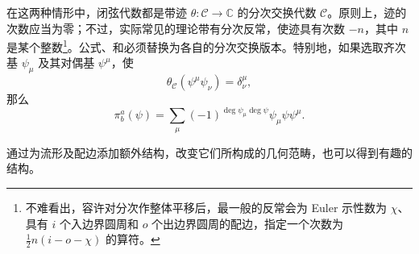 在这两种情形中，闭弦代数都是带迹 $\theta\colon\mathcal{C}\to\mathbb{C}$ 的分次交换代数 $\mathcal{C}$。原则上，迹的次数应当为零；不过，实际常见的理论带有分次反常，使迹具有次数 $-n$，其中 $n$ 是某个整数\footnote{不难看出，容许对分次作整体平移后，最一般的反常会为 Euler 示性数为 $\chi$、具有 $i$ 个入边界圆周和 $o$ 个出边界圆周的配边，指定一个次数为 $\frac12n(i-o-\chi)$ 的算符。}。公式、和必须替换为各自的分次交换版本。特别地，如果选取齐次基 $\psi_\mu$ 及其对偶基 $\psi^\mu$，使
\begin{equation}\label{eq:2.18}
\theta_{\mathcal{C}}(\psi^\mu\psi_\nu)=\delta^\mu_\nu,
\end{equation}
那么
\begin{equation}\label{eq:2.19}
\pi_b^a(\psi)=\sum_\mu(-1)^{\deg\psi_\mu\deg\psi}\psi_\mu\psi\psi^\mu.
\end{equation}

通过为流形及配边添加额外结构，改变它们所构成的几何范畴，也可以得到有趣的结构。

